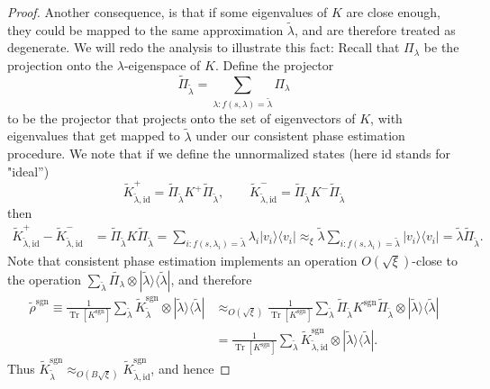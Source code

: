 \documentclass[a4paper,UKenglish,cleveref, autoref]{lipics-v2019}
\theoremstyle{remark}
\numberwithin{equation}{section}
\numberwithin{oracle}{section}
\numberwithin{remark}{section}
\newcommand{\ket}[1]{|#1\rangle}
\newcommand{\bra}[1]{\langle#1|}
\DeclareMathOperator{\tr}{Tr}
\begin{document}
\begin{proof}
Another consequence, is that  if some eigenvalues of $K$ are close enough, they could be mapped to the same approximation $\tilde\lambda$, and are therefore treated as degenerate. We will redo the analysis to illustrate this fact: Recall that $\Pi_\lambda$ be the projection onto the $\lambda$-eigenspace of $K$. Define the projector
\begin{equation}
\widetilde{\Pi}_{\tilde{\lambda}} = \sum_{\lambda: f(s,\lambda) = \tilde{\lambda}} \Pi_\lambda
\end{equation}
to be the projector that projects onto the set of eigenvectors of $K$, with eigenvalues that get mapped to $\tilde{\lambda}$ under our consistent phase estimation procedure. We note that if we define the unnormalized states (here $\text{id}$ stands for "ideal'')
\begin{equation}
\widetilde{K}^+_{\tilde{\lambda},\text{id}} = \widetilde{\Pi}_{\tilde{\lambda}}K^+\widetilde{\Pi}_{\tilde{\lambda}}, \quad \quad
\widetilde{K}^-_{\tilde{\lambda},\text{id}} = \widetilde{\Pi}_{\tilde{\lambda}}K^-\widetilde{\Pi}_{\tilde{\lambda}}
\end{equation}
then
\begin{align}
\widetilde{K}^+_{\tilde{\lambda},\text{id}} - \widetilde{K}^-_{\tilde{\lambda},\text{id}} &= \widetilde{\Pi}_{\tilde{\lambda}}K\widetilde{\Pi}_{\tilde{\lambda}}= \sum_{i: f(s,\lambda_i) = \tilde{\lambda}} \lambda_i \ket{v_i}\bra{v_i} \approx_{\xi} \tilde{\lambda} \sum_{i: f(s,\lambda_i) = \tilde{\lambda}} \ket{v_i}\bra{v_i}  = \tilde{\lambda} \widetilde{\Pi}_{\tilde{\lambda}}.
\end{align}
Note that consistent phase estimation implements an operation $O(\sqrt{\xi})$-close to the operation $\sum_{\tilde{\lambda}}\widetilde{\Pi_{\lambda}} \otimes \ket{\tilde{\lambda}}\bra{\tilde{\lambda}}$, and therefore
\begin{align}
\tilde{\rho}^{\text{sgn}}{\equiv} \frac{1}{\tr[K^{\text{sgn}}]}\sum_{\tilde{\lambda}} \widetilde{K}^{\text{sgn}}_{\tilde{\lambda}} \otimes \ket{\tilde{\lambda}}\bra{\tilde{\lambda}}&\approx_{O(\sqrt{\xi})} \frac{1}{\tr[K^{\text{sgn}}]} \sum_{\tilde{\lambda}} \widetilde{\Pi}_{\tilde{\lambda}} K^{\text{sgn}} \widetilde{\Pi}_{\tilde{\lambda}} \otimes \ket{\tilde{\lambda}}\bra{\tilde{\lambda}} \nonumber \\
&=\frac{1}{\tr[K^{\text{sgn}}]}\sum_{\tilde{\lambda}} \widetilde{K}^{\text{sgn}}_{\tilde{\lambda},\text{id}} \otimes \ket{\tilde{\lambda}}\bra{\tilde{\lambda}}.
\end{align}
Thus $\tilde{K}^{\text{sgn}}_{\tilde{\lambda}} \approx_{O(B\sqrt{\xi})} \tilde{K}^{\text{sgn}}_{\tilde{\lambda},\text{id}}$, and hence

\end{proof}
\end{document}
